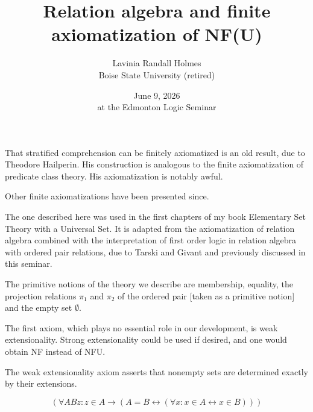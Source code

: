 \documentclass{slides}
\title{Relation algebra and finite axiomatization of NF(U)}
\author{Lavinia Randall Holmes\\Boise State University (retired)}
\date{June 9, 2026\\ at the Edmonton Logic Seminar}
\begin{document}
\begin{slide}

\maketitle

\end{slide}

\begin{slide}

That stratified comprehension can be finitely axiomatized is an old result, due to Theodore Hailperin.  His construction is analogous to the finite axiomatization of predicate class theory.  His axiomatization is notably awful.

Other finite axiomatizations have been presented since.

The one described here was used in the first chapters of my book Elementary Set Theory with a Universal Set.  It is adapted from the axiomatization of relation algebra combined with the interpretation of first order logic in relation algebra with ordered pair relations, due to Tarski and Givant and previously discussed in this seminar.

\end{slide}

\begin{slide}


The primitive notions of the theory we describe are membership, equality,  the projection relations $\pi_1$ and $\pi_2$ of the ordered pair [taken as a primitive notion] and the empty set $\emptyset$.

The first axiom, which plays no essential role in our development, is weak extensionality.  Strong extensionality could be used if desired, and one would obtain NF instead of NFU.

The weak extensionality axiom asserts that nonempty sets are determined exactly by their extensions.

$$(\forall ABz:z\in A \rightarrow (A=B \leftrightarrow (\forall x:x\in A \leftrightarrow x \in B)))$$

\end{slide}
\end{document}
